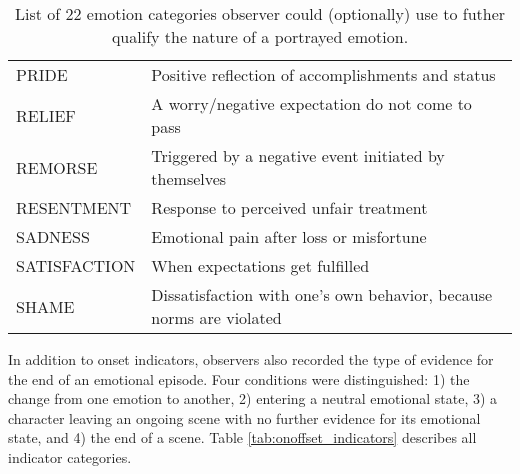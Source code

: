 \begin{table}
\begin{tabular}{lp{10cm}}
    PRIDE & Positive reflection of accomplishments and status \\
    RELIEF & A worry/negative expectation do not come to pass \\
    REMORSE & Triggered by a negative event initiated by themselves \\
    RESENTMENT & Response to perceived unfair treatment \\
    SADNESS & Emotional pain after loss or misfortune \\
    SATISFACTION & When expectations get fulfilled \\
    SHAME & Dissatisfaction with one's own behavior, because norms are violated \\
  \end{tabular}
  \caption{List of 22 emotion categories observer could (optionally) use to
  futher qualify the nature of a portrayed emotion.}
  \label{tab:emotion_categories}
\end{table}



In addition to onset indicators, observers also recorded the type of evidence
for the end of an emotional episode. Four conditions were distinguished: 1) the
change from one emotion to another, 2) entering a neutral emotional state, 3) a
character leaving an ongoing scene with no further evidence for its emotional
state, and 4) the end of a scene.  Table \ref{tab:onoffset_indicators}
describes all indicator categories.

